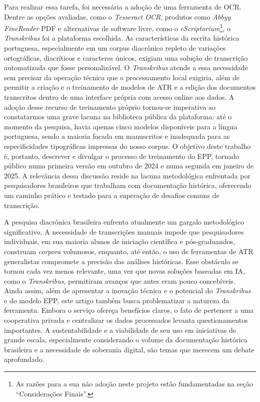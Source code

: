 \documentclass[portuguese]{textolivre}
\begin{document}
Para realizar essa tarefa, foi necessária a adoção de uma ferramenta de OCR. Dentre as opções avaliadas, como o \textit{Tesseract OCR}, produtos como \textit{Abbyy FineReader }PDF e alternativas de software livre, como o \textit{eScriptorium}\footnote{As razões para a sua não adoção neste projeto estão fundamentadas na seção “Considerações Finais”.}, o \textit{Transkribus }foi a plataforma escolhida. As características da escrita histórica portuguesa, especialmente em um corpus diacrônico repleto de variações ortográficas, diacríticos e caracteres únicos, exigiam uma solução de transcrição automatizada que fosse personalizável. O \textit{Transkribus }atende a essa necessidade sem precisar da operação técnica que o processamento local exigiria, além de permitir a criação e o treinamento de modelos de ATR e a edição dos documentos transcritos dentro de uma interface própria com acesso online aos dados. A adoção desse recurso de treinamento próprio tornou-se imperativa ao constatarmos uma grave lacuna na biblioteca pública da plataforma: até o momento da pesquisa, havia apenas cinco modelos disponíveis para a língua portuguesa, sendo a maioria focada em manuscritos e inadequada para as especificidades tipográficas impressas do nosso corpus. O objetivo deste trabalho é, portanto, descrever e divulgar o processo de treinamento do EPP, tornado público numa primeira versão em outubro de 2024 e numa segunda em janeiro de 2025. A relevância dessa discussão reside na lacuna metodológica enfrentada por pesquisadores brasileiros que trabalham com documentação histórica, oferecendo um caminho prático e testado para a superação de desafios comuns de transcrição.

A pesquisa diacrônica brasileira enfrenta atualmente um gargalo metodológico significativo. A necessidade de transcrições manuais impede que pesquisadores individuais, em sua maioria alunos de iniciação científica e pós-graduandos, construam\textit{ corpora }volumosos, enquanto, até então, o uso de ferramentas de ATR generalistas compromete a precisão das análises históricas. Esse obstáculo se tornou cada vez menos relevante, uma vez que novas soluções baseadas em IA, como o \textit{Transkribus}, permitiram avanços que antes eram pouco concebíveis. Ainda assim, além de apresentar a inovação técnica e o potencial do \textit{Transkribus} e do modelo EPP, este artigo também busca problematizar a natureza da ferramenta. Embora o serviço ofereça benefícios claros, o fato de pertencer a uma cooperativa privada e centralizar os dados processados levanta questionamentos importantes. A sustentabilidade e a viabilidade de seu uso em iniciativas de grande escala, especialmente considerando o volume da documentação histórica brasileira e a necessidade de soberania digital, são temas que merecem um debate aprofundado.
\end{document}
